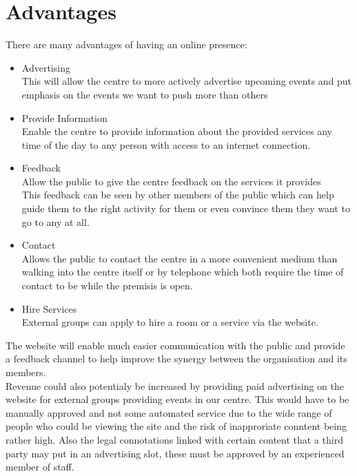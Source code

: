 \documentclass{article}
\begin{document}
\section{Advantages}
There are many advantages of having an online presence:
\begin{itemize}

\item Advertising
\\This will allow the centre to more actively advertise upcoming events and put emphasis on the events we want to push more than others

\item Provide Information
\\Enable the centre to provide information about the provided services any time of the day to any person with access to an internet connection.

\item Feedback
\\Allow the public to give the centre feedback on the services it provides
\\This feedback can be seen by other members of the public which can help guide them to the right activity for them or even convince them they want to go to any at all.

\item Contact
\\Allows the public to contact the centre in a more convenient medium than walking into the centre itself or by telephone which both require the time of contact to be while the premisis is open.

\item Hire Services
\\External groups can apply to hire a room or a service via the website.

\end{itemize}
The website will enable much easier communication with the public and provide a feedback channel to help improve the synergy between the organisation and its members.
\\Revenue could also potentialy be increased by providing paid advertising on the website for external groups providing events in our centre.  This would have to be manually approved and not some automated service due to the wide range of people who could be viewing the site and the risk of inapproriate conntent being rather high.  Also the legal connotations linked with certain content that a third party may put in an advertising slot, these must be approved by an experienced member of staff.
\end{document}
